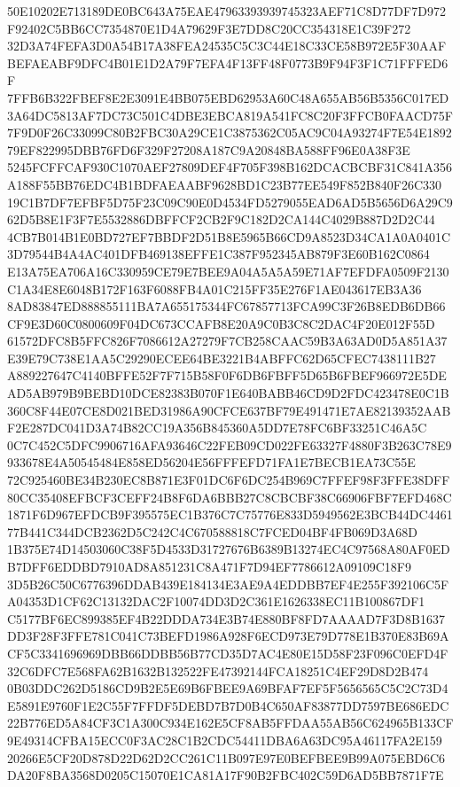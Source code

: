 \documentclass[UTF8,fontset=fandol,zihao=-4,a4paper]{ctexart}
\begin{document}
{{50E10202E713189DE0BC643A75EAE47963393939745323AEF71C8D77DF7D972F92402C5BB6CC7354870E1D4A79629F3E7DD8C20CC354318E1C39F272
32D3A74FEFA3D0A54B17A38FEA24535C5C3C44E18C33CE58B972E5F30AAFBEFAEABF9DFC4B01E1D2A79F7EFA4F13FF48F0773B9F94F3F1C71FFFED6F
7FFB6B322FBEF8E2E3091E4BB075EBD62953A60C48A655AB56B5356C017ED3A64DC5813AF7DC73C501C4DBE3EBCA819A541FC8C20F3FFCB0FAACD75F
7F9D0F26C33099C80B2FBC30A29CE1C3875362C05AC9C04A93274F7E54E189279EF822995DBB76FD6F329F27208A187C9A20848BA588FF96E0A38F3E
5245FCFFCAF930C1070AEF27809DEF4F705F398B162DCACBCBF31C841A356A188F55BB76EDC4B1BDFAEAABF9628BD1C23B77EE549F852B840F26C330
19C1B7DF7EFBF5D75F23C09C90E0D4534FD5279055EAD6AD5B5656D6A29C962D5B8E1F3F7E5532886DBFFCF2CB2F9C182D2CA144C4029B887D2D2C44
4CB7B014B1E0BD727EF7BBDF2D51B8E5965B66CD9A8523D34CA1A0A0401C3D79544B4A4AC401DFB469138EFFE1C387F952345AB879F3E60B162C0864
E13A75EA706A16C330959CE79E7BEE9A04A5A5A59E71AF7EFDFA0509F2130C1A34E8E6048B172F163F6088FB4A01C215FF35E276F1AE043617EB3A36
8AD83847ED888855111BA7A655175344FC67857713FCA99C3F26B8EDB6DB66CF9E3D60C0800609F04DC673CCAFB8E20A9C0B3C8C2DAC4F20E012F55D
61572DFC8B5FFC826F7086612A27279F7CB258CAAC59B3A63AD0D5A851A37E39E79C738E1AA5C29290ECEE64BE3221B4ABFFC62D65CFEC7438111B27
A889227647C4140BFFE52F7F715B58F0F6DB6FBFF5D65B6FBEF966972E5DEAD5AB979B9BEBD10DCE82383B070F1E640BABB46CD9D2FDC423478E0C1B
360C8F44E07CE8D021BED31986A90CFCE637BF79E491471E7AE82139352AABF2E287DC041D3A74B82CC19A356B845360A5DD7E78FC6BF33251C46A5C
0C7C452C5DFC9906716AFA93646C22FEB09CD022FE63327F4880F3B263C78E9933678E4A50545484E858ED56204E56FFFEFD71FA1E7BECB1EA73C55E
72C925460BE34B230EC8B871E3F01DC6F6DC254B969C7FFEF98F3FFE38DFF80CC35408EFBCF3CEFF24B8F6DA6BBB27C8CBCBF38C66906FBF7EFD468C
1871F6D967EFDCB9F395575EC1B376C7C75776E833D5949562E3BCB44DC446177B441C344DCB2362D5C242C4C670588818C7FCED04BF4FB069D3A68D
1B375E74D14503060C38F5D4533D31727676B6389B13274EC4C97568A80AF0EDB7DFF6EDDBD7910AD8A851231C8A471F7D94EF7786612A09109C18F9
3D5B26C50C6776396DDAB439E184134E3AE9A4EDDBB7EF4E255F392106C5FA04353D1CF62C13132DAC2F10074DD3D2C361E1626338EC11B100867DF1
C5177BF6EC899385EF4B22DDDA734E3B74E880BF8FD7AAAAD7F3D8B1637DD3F28F3FFE781C041C73BEFD1986A928F6ECD973E79D778E1B370E83B69A
CF5C3341696969DBB66DDBB56B77CD35D7AC4E80E15D58F23F096C0EFD4F32C6DFC7E568FA62B1632B132522FE47392144FCA18251C4EF29D8D2B474
0B03DDC262D5186CD9B2E5E69B6FBEE9A69BFAF7EF5F5656565C5C2C73D4E5891E9760F1E2C55F7FFDF5DEBD7B7D0B4C650AF83877DD7597BE686EDC
22B776ED5A84CF3C1A300C934E162E5CF8AB5FFDAA55AB56C624965B133CF9E49314CFBA15ECC0F3AC28C1B2CDC54411DBA6A63DC95A46117FA2E159
20266E5CF20D878D22D62D2CC261C11B097E97E0BEFBEE9B99A075EBD6C6DA20F8BA3568D0205C15070E1CA81A17F90B2FBC402C59D6AD5BB7871F7E
}}
\end{document}
